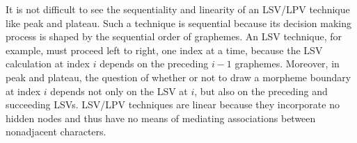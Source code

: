 It is not difficult to see the sequentiality and linearity of an LSV/LPV technique like peak and plateau.
Such a technique is sequential because its decision making process is shaped by the sequential order of graphemes.
An LSV technique, for example, must proceed left to right, one index at a time, because the LSV calculation at index $i$ depends on the preceding $i-1$ graphemes. Moreover, in peak and plateau, the question of whether or not to draw a morpheme boundary at index $i$ depends not only on the LSV at $i$, but also on the preceding and succeeding LSVs. LSV/LPV techniques are linear because they incorporate no hidden nodes and thus have no means of mediating associations between nonadjacent characters.
%


